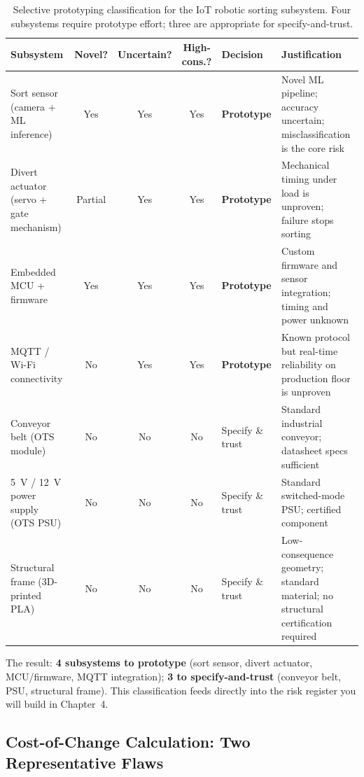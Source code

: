 \begin{table}[htbp]
  \centering
  \caption{Selective prototyping classification for the IoT robotic sorting
           subsystem. Four subsystems require prototype effort; three are
           appropriate for specify-and-trust.}
  \label{tab:ch3-classification}
  \small
  \begin{tabular}{p{3.0cm} c c c p{1.8cm} p{4.5cm}}
    \toprule
    Subsystem &
      Novel? &
      Uncertain? &
      High-cons.? &
      Decision &
      Justification \\
    \midrule
    Sort sensor (camera + ML inference)
      & Yes & Yes & Yes
      & \textbf{Prototype}
      & Novel ML pipeline; accuracy uncertain; misclassification is the core
        risk \\[4pt]
    Divert actuator (servo + gate mechanism)
      & Partial & Yes & Yes
      & \textbf{Prototype}
      & Mechanical timing under load is unproven; failure stops sorting \\[4pt]
    Embedded MCU + firmware
      & Yes & Yes & Yes
      & \textbf{Prototype}
      & Custom firmware and sensor integration; timing and power unknown \\[4pt]
    MQTT / Wi-Fi connectivity
      & No & Yes & Yes
      & \textbf{Prototype}
      & Known protocol but real-time reliability on production floor is
        unproven \\[4pt]
    Conveyor belt (OTS module)
      & No & No & No
      & Specify \& trust
      & Standard industrial conveyor; datasheet specs sufficient \\[4pt]
    5~V / 12~V power supply (OTS PSU)
      & No & No & No
      & Specify \& trust
      & Standard switched-mode PSU; certified component \\[4pt]
    Structural frame (3D-printed PLA)
      & No & No & No
      & Specify \& trust
      & Low-consequence geometry; standard material; no structural
        certification required \\
    \bottomrule
  \end{tabular}
\end{table}

The result: \textbf{4 subsystems to prototype} (sort sensor, divert actuator,
MCU/firmware, MQTT integration); \textbf{3 to specify-and-trust} (conveyor
belt, PSU, structural frame).
This classification feeds directly into the risk register you will build in
Chapter~4.

\subsection{Cost-of-Change Calculation: Two Representative Flaws}

